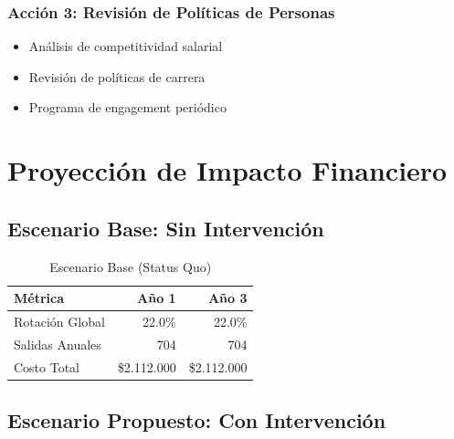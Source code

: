 \documentclass[11pt,a4paper,twoside]{article}
\begin{document}
\subsubsection{Acción 3: Revisión de Políticas de Personas}

\begin{itemize}
    \item Análisis de competitividad salarial
    \item Revisión de políticas de carrera
    \item Programa de engagement periódico
\end{itemize}

\newpage

\section{Proyección de Impacto Financiero}

\subsection{Escenario Base: Sin Intervención}

\begin{table}[H]
    \centering
    \caption{Escenario Base (Status Quo)}
    \begin{tabular}{|l|r|r|}
        \toprule
        \textbf{Métrica} & \textbf{Año 1} & \textbf{Año 3} \\
        \midrule
        Rotación Global & 22.0\% & 22.0\% \\
        Salidas Anuales & 704 & 704 \\
        Costo Total & \$2.112.000 & \$2.112.000 \\
        \bottomrule
    \end{tabular}
\end{table}

\subsection{Escenario Propuesto: Con Intervención}
\end{document}
